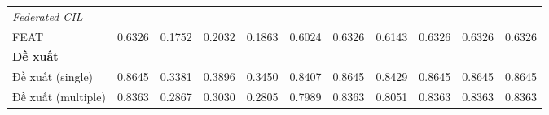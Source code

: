 \begin{table}[H]
{\begin{tabular}{lcccccccccc}
        \hline
        \multicolumn{11}{l}{\textit{Federated CIL}} \\
        FEAT & 0.6326 & 0.1752 & 0.2032 & 0.1863 & 0.6024 & 0.6326 & 0.6143 & 0.6326 & 0.6326 & 0.6326 \\
        \hline
        \multicolumn{11}{l}{\textbf{Đề xuất}} \\
        Đề xuất (single) & \cellcolor{green!60!black}0.8645 & \cellcolor{green!60!black}0.3381 & \cellcolor{green!90!black}0.3896 & \cellcolor{green!90!black}0.3450 & \cellcolor{green!60!black}0.8407 & \cellcolor{green!60!black}0.8645 & \cellcolor{green!60!black}0.8429 & \cellcolor{green!60!black}0.8645 & \cellcolor{green!60!black}0.8645 & \cellcolor{green!60!black}0.8645 \\
        Đề xuất (multiple) & 0.8363 & \cellcolor{green!30}0.2867 & \cellcolor{green!30}0.3030 & \cellcolor{green!30}0.2805 & \cellcolor{green!90!black}0.7989 & 0.8363 & 0.8051 & 0.8363 & 0.8363 & 0.8363 \\
        \hline
    \end{tabular}}
\end{table}

